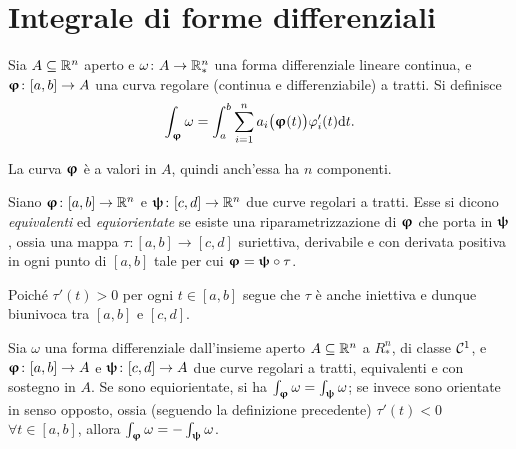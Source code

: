 \section{Integrale di forme differenziali}
\begin{definizione}
	Sia $A\subseteq\mathbb{R}^n$ aperto e $\omega\colon A\to\mathbb{R}^n_*$ una forma differenziale lineare continua, e $\bm{\upvarphi}\colon[a,b]\to A$ una curva regolare (continua e differenziabile) a tratti.
	Si definisce
	\begin{equation} 
		\int_{\bm{\upvarphi}}\omega=\int_a^b\sum_{i=1}^na_i\big(\bm{\upvarphi}(t)\big)\varphi_i'(t)\textup{d} t.
		\label{eq:integrale-forma-diff-lin}
	\end{equation}
\end{definizione}
	La curva $\bm{\upvarphi}$ è a valori in $A$, quindi anch'essa ha $n$ componenti.
\begin{definizione}
	Siano $\bm{\upvarphi}\colon[a,b]\to\mathbb{R}^n$ e $\bm{\uppsi}\colon[c,d]\to\mathbb{R}^n$ due curve regolari a tratti.
	Esse si dicono \emph{equivalenti} ed \emph{equiorientate} se esiste una riparametrizzazione di $\bm{\upvarphi}$ che porta in $\bm{\uppsi}$, ossia una mappa $\tau\colon[a,b]\to[c,d]$ suriettiva, derivabile e con derivata positiva in ogni punto di $[a,b]$ tale per cui $\bm{\upvarphi}=\bm{\uppsi}\circ\tau$.
\end{definizione}
Poiché $\tau'(t)>0$ per ogni $t\in[a,b]$ segue che $\tau$ è anche iniettiva e dunque biunivoca tra $[a,b]$ e $[c,d]$.
\begin{teorema}
	Sia $\omega$ una forma differenziale dall'insieme aperto $A\subseteq\mathbb{R}^n$ a $R^n_*$, di classe $\mathcal{C}^{{1}}$, e $\bm{\upvarphi}\colon[a,b]\to A$ e $\bm{\uppsi}\colon [c,d]\to A$ due curve regolari a tratti, equivalenti e con sostegno in $A$.
	Se sono equiorientate, si ha $\int_{\bm{\upvarphi}}\omega=\int_{\bm{\uppsi}}\omega$; se invece sono orientate in senso opposto, ossia (seguendo la definizione precedente) $\tau'(t)<0$ $\forall t\in[a,b]$, allora $\int_{\bm{\upvarphi}}\omega=-\int_{\bm{\uppsi}}\omega$.
\end{teorema}
